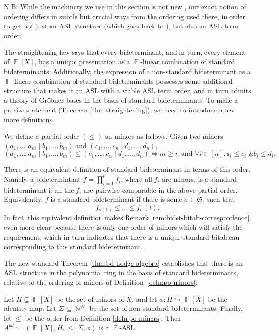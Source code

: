 \documentclass[11pt,reqno]{amsart}
\DeclareMathOperator{\W}{\mathbb{W}}
\DeclareMathOperator{\F}{\mathbb{F}}
\newcommand{\bidet}[2]{(#1\;|\;#2)}
\newcommand{\gb}{Gr\"{o}bner }
\theoremstyle{definition}
\numberwithin{equation}{section}
\begin{document}
N.B: While the machinery we use in this section is not new \cite{desarmenien1982invariant,desarmenien1980algorithm}, our exact notion of ordering differs in subtle but crucial ways from the ordering used there, in order to get not just an ASL structure (which goes back to \cite{deconcini1987hodge,eisenbud-intro-1980}), but also an ASL term order.

The straightening law says that every bideterminant, and in turn, every element of $\F[X]$, has a unique presentation as a $\F$-linear combination of standard bideterminants. Additionally, the expression of a non-standard bideterminant as a $\F$-linear combination of standard bideterminants possesses some additional structure that makes it an ASL with a viable ASL term order, and in turn admits a theory of \gb bases in the basis of standard bideterminants. To make a precise statement (Theorem \ref{thm:straightening}), we need to introduce a few more definitions.

\begin{definition}
\label{defn:po-minors}
We define a partial order $(\le)$ on minors as follows. Given two minors $\bidet{a_1, \ldots, a_m}{b_1, \ldots, b_m}$ and $\bidet{c_1, \ldots, c_n}{d_1, \ldots, d_n}$,
\[\bidet{a_1, \ldots, a_m}{b_1, \ldots, b_m} \le \bidet{c_1, \ldots, c_n}{d_1, \ldots, d_n} \iff m \ge n \text{ and } \forall i \in [n], a_i \le c_i \text{ \& } b_i \le d_i.\]
\end{definition}

There is an equivalent definition of standard bideterminant in terms of this order. Namely, a bidetermintant $f = \prod_{i=1}^t f_i$, where all $f_i$ are minors, is a standard bideterminant if all the $f_i$ are pairwise comparable in the above partial order. Equivalently, $f$ is a standard bideterminant if there is some $\sigma \in \mathfrak{S}_t$ such that \[f_{\sigma(1)} \le \ldots \le f_\sigma(t).\] In fact, this equivalent definition makes Remark \ref{rem:bidet-bitab-correspondence} even more clear because there is only one order of minors which will satisfy the requirement, which in turn indicates that there is a unique standard bitableau corresponding to this standard bideterminant.

The now-standard Theorem \ref{thm:bd-hodge-algebra} establishes that there is an ASL structure in the polynomial ring in the basis of standard bideterminants, relative to the ordering of minors of Definition~\ref{defn:po-minors}:

\begin{theorem} 
\label{thm:bd-hodge-algebra}
Let $H \subseteq \F[X]$ be the set of minors of $X$, and let $\phi: H \hookrightarrow \F[X]$ be the identity map. Let $\Sigma \subseteq \W^H$ be the set of non-standard bideterminants. Finally, let $\le$ be the order from Definition \ref{defn:po-minors}. Then $A^{bd} := (\F[X], H, \le, \Sigma, \phi)$ is a $\F$-ASL.
\end{theorem}
\end{document}
